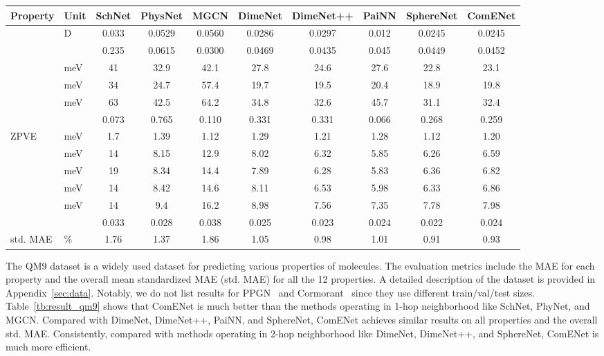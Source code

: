 \documentclass{article}
\begin{document}
\begin{table*}[t]
\begin{center}
\caption{Comparisons between ComENet and other models
    in terms of MAE and the overall mean std. MAE on QM9.
}\label{tb:result_qm9}
\resizebox{\textwidth}{!}
{\begin{tabular}{llcccccccc}
\toprule
Property &Unit &SchNet &PhysNet &MGCN &DimeNet &DimeNet++ &PaiNN &SphereNet &ComENet \\
\midrule
                  &D      &0.033 &0.0529 &0.0560 &0.0286 &0.0297 &0.012 &0.0245 & 0.0245\\
            & &0.235 &0.0615 &0.0300 &0.0469 &0.0435 &0.045 &0.0449 & 0.0452\\
 &meV    &41    &32.9   &42.1   &27.8   &24.6   &27.6   &22.8  & 23.1\\
 &meV    &34    &24.7   &57.4   &19.7   &19.5   &20.4   &18.9  & 19.8\\
       &meV    &63    &42.5   &64.2   &34.8   &32.6   &45.7   &31.1  & 32.4\\
 & &0.073 &0.765  &0.110  &0.331  &0.331  &0.066  &0.268 & 0.259\\
ZPVE  &meV    &1.7   &1.39   &1.12   &1.29   &1.21   &1.28   &1.12  & 1.20\\
    &meV    &14    &8.15   &12.9   &8.02   &6.32   &5.85   &6.26  & 6.59\\
     &meV    &19    &8.34   &14.4   &7.89   &6.28   &5.83   &6.36  & 6.82\\
     &meV    &14    &8.42   &14.6   &8.11   &6.53   &5.98   &6.33  & 6.86\\
     &meV    &14    &9.4    &16.2   &8.98   &7.56   &7.35   &7.78  & 7.98\\
 & &0.033 &0.028  &0.038  &0.025  &0.023  &0.024  &0.022 & 0.024\\
\midrule
std. MAE &\%  &1.76  &1.37   &1.86   &1.05   &0.98   &1.01   &0.91  &0.93 \\
\bottomrule
\end{tabular}}
\end{center}
\vspace{-10 pt}
\end{table*}

The QM9 dataset is a widely used dataset for predicting various properties of molecules. 
The evaluation metrics include the MAE for each property and the overall mean standardized MAE (std. MAE) for all the 12 properties. A detailed description of the dataset is provided in Appendix~\ref{sec:data}.
Notably, we do not list results for PPGN~\cite{maron2019provably} and Cormorant~\cite{anderson2019cormorant} since they use different train/val/test sizes. 
Table~\ref{tb:result_qm9} shows that ComENet 
is much better than the methods operating in 1-hop neighborhood like SchNet, PhyNet, and MGCN.
Compared with DimeNet, DimeNet++, PaiNN, and SphereNet,
ComENet achieves similar results on all properties
and the overall std. MAE.
Consistently, compared with methods operating in 2-hop neighborhood
like DimeNet, DimeNet++, and SphereNet, ComENet is much more efficient.
\end{document}
